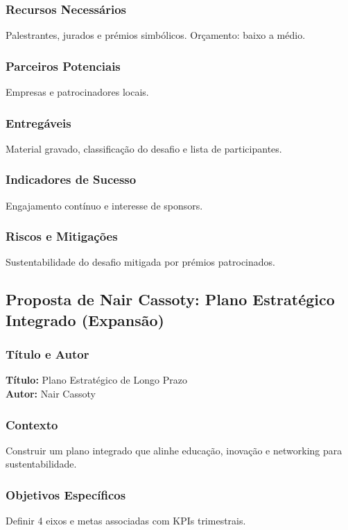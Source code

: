 \documentclass[12pt,a4paper]{article}
\begin{document}
\subsubsection*{Recursos Necessários}
Palestrantes, jurados e prémios simbólicos. Orçamento: baixo a médio.

\subsubsection*{Parceiros Potenciais}
Empresas e patrocinadores locais.

\subsubsection*{Entregáveis}
Material gravado, classificação do desafio e lista de participantes.

\subsubsection*{Indicadores de Sucesso}
Engajamento contínuo e interesse de sponsors.

\subsubsection*{Riscos e Mitigações}
Sustentabilidade do desafio mitigada por prémios patrocinados.

\subsection{Proposta de Nair Cassoty: Plano Estratégico Integrado (Expansão)}

\subsubsection*{Título e Autor}
\textbf{Título:} Plano Estratégico de Longo Prazo \\
\textbf{Autor:} Nair Cassoty

\subsubsection*{Contexto}
Construir um plano integrado que alinhe educação, inovação e networking para sustentabilidade.

\subsubsection*{Objetivos Específicos}
Definir 4 eixos e metas associadas com KPIs trimestrais.
\end{document}
